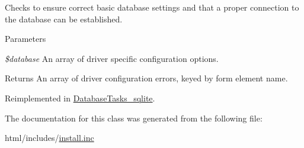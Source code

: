 Checks to ensure correct basic database settings and that a proper connection to the database can be established.


\begin{DoxyParams}{Parameters}
\item[{\em \$database}]An array of driver specific configuration options.\end{DoxyParams}
\begin{DoxyReturn}{Returns}
An array of driver configuration errors, keyed by form element name. 
\end{DoxyReturn}


Reimplemented in \hyperlink{classDatabaseTasks__sqlite_a3d2e2aff4e7a3d890a82b057aab722c4}{DatabaseTasks\_\-sqlite}.

The documentation for this class was generated from the following file:\begin{DoxyCompactItemize}
\item 
html/includes/\hyperlink{install_8inc}{install.inc}\end{DoxyCompactItemize}

